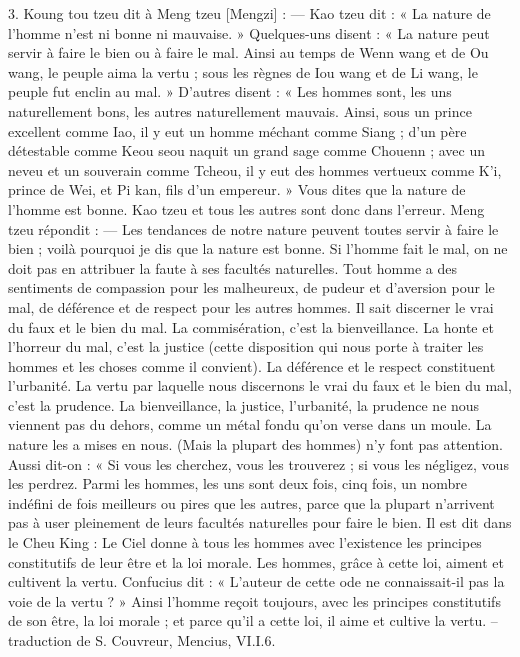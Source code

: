 \begin{singlequote}
    3.	Koung tou tzeu dit à Meng tzeu [Mengzi] :
—	Kao tzeu dit : « La nature de l’homme n’est ni bonne ni mauvaise. » Quelques-uns disent :
« La nature peut servir à faire le bien ou à faire le mal. Ainsi au temps de Wenn wang et de Ou wang, le peuple aima la vertu ; sous les règnes de Iou wang et de Li wang, le peuple fut enclin au mal. » D’autres disent : « Les hommes sont, les uns naturellement bons, les autres naturellement mauvais. Ainsi, sous un prince excellent comme Iao, il y eut un homme méchant comme Siang ; d’un père détestable comme Keou seou naquit un grand sage comme Chouenn ; avec un neveu et un souverain comme Tcheou, il y eut des hommes vertueux comme K’i, prince
de Wei, et Pi kan, fils d’un empereur. » Vous dites que la nature de l’homme est bonne. Kao tzeu et tous les autres sont donc dans l’erreur.
Meng tzeu répondit :
—	Les tendances de notre nature peuvent toutes servir à faire le bien ; voilà pourquoi je dis que la nature est bonne. Si l’homme fait le mal, on ne doit pas en attribuer la faute à ses facultés naturelles.
Tout homme a des sentiments de compassion pour les malheureux, de pudeur et d’aversion pour le mal, de déférence et de respect pour les autres hommes. Il sait discerner le vrai du faux et le bien du mal. La commisération, c’est la bienveillance. La honte et l’horreur du mal, c’est la justice (cette disposition qui nous porte à traiter les hommes et les choses comme il convient). La déférence et le respect constituent l’urbanité. La vertu par laquelle nous discernons le vrai du faux et le bien du mal, c’est la prudence. La bienveillance, la justice, l’urbanité, la prudence ne nous viennent pas du dehors, comme un métal fondu qu’on verse dans un moule. La nature les a mises en nous. (Mais la plupart des hommes) n’y font pas attention. Aussi dit-on : « Si vous les cherchez, vous les trouverez ; si vous les négligez, vous les perdrez. Parmi les hommes, les uns sont deux fois, cinq fois, un nombre indéfini de fois meilleurs ou pires que les autres, parce que la plupart n’arrivent pas à user pleinement de leurs facultés naturelles pour faire le bien.
Il est dit dans le Cheu King :
Le Ciel donne à tous les hommes avec l’existence les principes constitutifs de leur être et la loi morale. Les hommes, grâce à cette loi, aiment et cultivent la vertu.
Confucius dit : « L’auteur de cette ode ne connaissait-il pas la voie de la vertu ? » Ainsi l’homme reçoit toujours, avec les principes constitutifs de son être, la loi morale ; et parce qu’il a cette loi, il aime et cultive la vertu.
-- traduction de S. Couvreur, Mencius, VI.I.6.

\end{singlequote}

